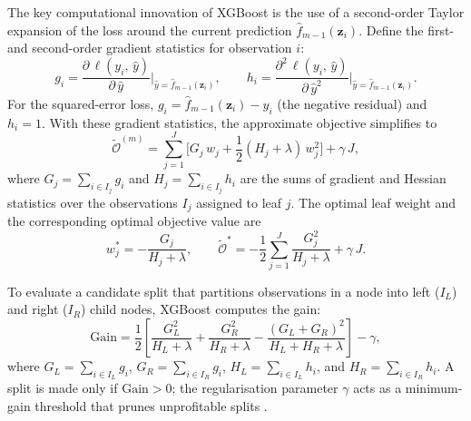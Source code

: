 The key computational innovation of XGBoost is the use of a
second-order Taylor expansion of the loss around the current prediction
$\hat{f}_{m-1}(\mathbf{z}_i)$.  Define the first- and second-order
gradient statistics for observation $i$:
\begin{equation}
    g_i
    =
    \frac{\partial\, \ell(y_i,\, \hat{y})}{\partial\, \hat{y}}
    \bigg|_{\hat{y} = \hat{f}_{m-1}(\mathbf{z}_i)},
    \qquad
    h_i
    =
    \frac{\partial^{2}\, \ell(y_i,\, \hat{y})}{\partial\, \hat{y}^{2}}
    \bigg|_{\hat{y} = \hat{f}_{m-1}(\mathbf{z}_i)}.
    \label{eq:xgb_gradient_hessian}
\end{equation}
For the squared-error loss, $g_i = \hat{f}_{m-1}(\mathbf{z}_i) - y_i$
(the negative residual) and $h_i = 1$.  With these gradient statistics,
the approximate objective simplifies to
\begin{equation}
    \tilde{\mathcal{O}}^{(m)}
    =
    \sum_{j=1}^{J}
    \Biggl[
        G_j \, w_j
        +
        \frac{1}{2}(H_j + \lambda)\, w_j^{2}
    \Biggr]
    +
    \gamma \, J,
    \label{eq:xgb_approx_objective}
\end{equation}
where $G_j = \sum_{i \in I_j} g_i$ and $H_j = \sum_{i \in I_j} h_i$ are
the sums of gradient and Hessian statistics over the observations
$I_j$ assigned to leaf $j$.  The optimal leaf weight and the
corresponding optimal objective value are
\begin{equation}
    w_j^{*}
    =
    -\frac{G_j}{H_j + \lambda},
    \qquad
    \tilde{\mathcal{O}}^{*}
    =
    -\frac{1}{2}
    \sum_{j=1}^{J}
    \frac{G_j^{2}}{H_j + \lambda}
    +
    \gamma \, J.
    \label{eq:xgb_optimal_leaf}
\end{equation}

To evaluate a candidate split that partitions observations in a node into
left ($I_L$) and right ($I_R$) child nodes, XGBoost computes the
gain:
\begin{equation}
    \mathrm{Gain}
    =
    \frac{1}{2}
    \left[
        \frac{G_L^{2}}{H_L + \lambda}
        +
        \frac{G_R^{2}}{H_R + \lambda}
        -
        \frac{(G_L + G_R)^{2}}{H_L + H_R + \lambda}
    \right]
    -
    \gamma,
    \label{eq:xgb_split_gain}
\end{equation}
where $G_L = \sum_{i \in I_L} g_i$, $G_R = \sum_{i \in I_R} g_i$,
$H_L = \sum_{i \in I_L} h_i$, and $H_R = \sum_{i \in I_R} h_i$.  A
split is made only if $\mathrm{Gain} > 0$; the regularisation parameter
$\gamma$ acts as a minimum-gain threshold that prunes unprofitable splits
\citep{chen2016xgboost}.

